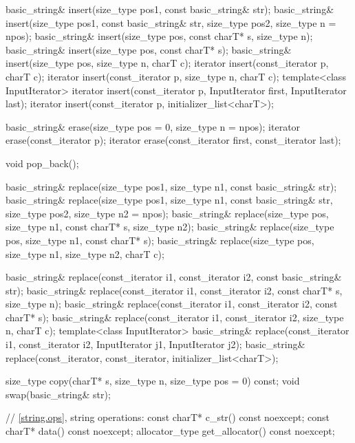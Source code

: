 \begin{codeblock}
{{    basic_string& insert(size_type pos1, const basic_string& str);
    basic_string& insert(size_type pos1, const basic_string& str,
                         size_type pos2, size_type n = npos);
    basic_string& insert(size_type pos, const charT* s, size_type n);
    basic_string& insert(size_type pos, const charT* s);
    basic_string& insert(size_type pos, size_type n, charT c);
    iterator insert(const_iterator p, charT c);
    iterator insert(const_iterator p, size_type n, charT c);
    template<class InputIterator>
      iterator insert(const_iterator p, InputIterator first, InputIterator last);
    iterator insert(const_iterator p, initializer_list<charT>);

    basic_string& erase(size_type pos = 0, size_type n = npos);
    iterator erase(const_iterator p);
    iterator erase(const_iterator first, const_iterator last);

    void pop_back();

    basic_string& replace(size_type pos1, size_type n1,
                          const basic_string& str);
    basic_string& replace(size_type pos1, size_type n1,
                          const basic_string& str,
                          size_type pos2, size_type n2 = npos);
    basic_string& replace(size_type pos, size_type n1, const charT* s,
                          size_type n2);
    basic_string& replace(size_type pos, size_type n1, const charT* s);
    basic_string& replace(size_type pos, size_type n1, size_type n2,
                          charT c);

    basic_string& replace(const_iterator i1, const_iterator i2,
              const basic_string& str);
    basic_string& replace(const_iterator i1, const_iterator i2, const charT* s,
                          size_type n);
    basic_string& replace(const_iterator i1, const_iterator i2, const charT* s);
    basic_string& replace(const_iterator i1, const_iterator i2,
                          size_type n, charT c);
    template<class InputIterator>
      basic_string& replace(const_iterator i1, const_iterator i2,
                            InputIterator j1, InputIterator j2);
    basic_string& replace(const_iterator, const_iterator, initializer_list<charT>);

    size_type copy(charT* s, size_type n, size_type pos = 0) const;
    void swap(basic_string& str);

    // \ref{string.ops}, string operations:
    const charT* c_str() const noexcept;
    const charT* data() const noexcept;
    allocator_type get_allocator() const noexcept;

}}
\end{codeblock}
